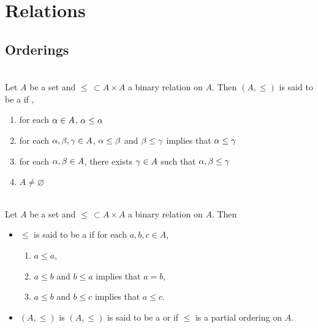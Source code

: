 \documentclass{book}
\begin{document}
	\section{Relations}
	
	
	
	\subsection{Orderings}
	
	\begin{defn}   \\
		Let $A$ be a set and $\leq \, \subset A \times A$ a binary relation on $A$. Then $(A, \leq)$ is said to be a  if , 
		\begin{enumerate}
			\item for each $\alpha \in A$, $\alpha \leq \alpha$
			\item for each $\alpha, \beta, \gamma \in A$, $\alpha \leq \beta$ and $\beta \leq \gamma$ implies that $\alpha \leq \gamma$
			\item for each $\alpha, \beta \in A$, there exists $\gamma \in A$ such that $\alpha, \beta \leq \gamma$
			\item $A \neq \varnothing$
		\end{enumerate}
	\end{defn}

	
	\begin{defn}   \\
		Let $A$ be a set and $\leq \, \subset A \times A$ a binary relation on $A$. Then 
		\begin{itemize}
			\item $\leq$ is said to be a  if for each $a,b,c \in A$,
			\begin{enumerate}
				\item $a \leq a$,
				\item $a \leq b$ and $b \leq a$ implies that $a = b$,
				\item $a \leq b$ and $b \leq c$ implies that $a \leq c$.
			\end{enumerate}
			\item $(A, \leq)$ is $(A, \leq)$ is said to be a  or  if
			$\leq$ is a partial ordering on $A$.
		\end{itemize}
	\end{defn}
	
	
	
\end{document}
